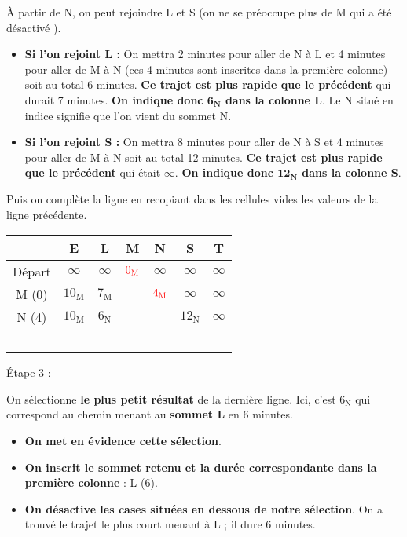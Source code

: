 \`A partir de N, on peut rejoindre L et S (on ne se préoccupe plus de M qui a été \og désactivé \fg{}).
\begin{itemize}
     \item \textbf{Si l'on rejoint L :} On mettra 2 minutes pour aller de N à L et 4 minutes pour aller de M à N (ces 4 minutes sont inscrites dans la première colonne) soit au total 6 minutes. \textbf{Ce trajet est plus rapide que le précédent} qui durait 7 minutes. \textbf{On indique donc $\bm{6_{\text{N}}}$ dans la colonne L}. Le N situé en indice signifie que l'on vient du sommet N.
     \item \textbf{Si l'on rejoint S :} On mettra 8 minutes pour aller de N à S et 4 minutes pour aller de M à N soit au total 12 minutes. \textbf{Ce trajet est plus rapide que le précédent} qui était $\infty$. \textbf{On indique donc $\bm{12_{\text{N}}}$ dans la colonne S}.
\end{itemize}
Puis on complète la ligne en recopiant dans les cellules vides les valeurs de la ligne précédente.
\begin{center}
     \begin{extern}
          \begin{tabularx}{0.9\linewidth}{|c|C|C|C|C|C|C|}
               \hline
               \			&  E 						& L							& M							& N 							& S								& T  						\\ \hline
               Départ			&  $\infty$	 				& $\infty$					& $\color{red}0_{\text{M}}$	& $\infty$					& $\infty$						& $\infty$	  				\\ \hline
               M (0) 			&  $10_{\text{M}}$	 		& $7_{\text{M}}$	 			& 		& $\color{red}4_{\text{M}}$	& $\infty$						& $\infty$ 					\\ \hline
               N (4)			&  $10_{\text{M}}$	 		& $6_{\text{N}}$	& \cellcolor{black!20}		& 		& $12_{\text{N}}$				& $\infty$ 					\\ \hline
               \ 				&  \ 						& \ 							& 		& 	 							& \
          \end{tabularx}
     \end{extern}
\end{center}
\begin{h2}\'Etape 3 :\end{h2}
On sélectionne \textbf{le plus petit résultat} de la dernière ligne. Ici, c'est \og $6_{\text{N}}$ \fg{} qui correspond au chemin menant au \textbf{sommet L} en 6 minutes.
\begin{itemize}
     \item \textbf{On met en évidence cette sélection}.
     \item \textbf{On inscrit le sommet retenu et la durée correspondante dans la première colonne} : L (6).
     \item \textbf{On désactive les cases situées en dessous de notre sélection}. On a trouvé le trajet le plus court menant à L ; il dure 6 minutes.
\end{itemize}
